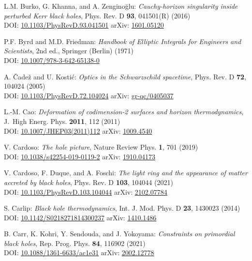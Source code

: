 \begin{thebibliography}{123}
L.M. Burko, G. Khanna, and A. Zenginoğlu: {\em
Cauchy-horizon singularity inside perturbed Kerr black holes},
Phys. Rev. D {\bf 93}, 041501(R) (2016) \\
DOI: \href{https://doi.org/10.1103/PhysRevD.93.041501}{10.1103/PhysRevD.93.041501}\hfill
arXiv: \href{https://arxiv.org/abs/1601.05120}{1601.05120}

P.F. Byrd and M.D. Friedman:
{\em Handbook of Elliptic Integrals for Engineers and Scientists},
2nd ed., Springer (Berlin) (1971)\\
DOI: \href{https://doi.org/10.1007/978-3-642-65138-0}{10.1007/978-3-642-65138-0}

A. \v{C}ade\v{z} and U. Kosti\'c:
{\em Optics in the Schwarzschild spacetime},
Phys. Rev. D {\bf 72}, 104024 (2005)\\
DOI: \href{https://doi.org/10.1103/PhysRevD.72.104024}{10.1103/PhysRevD.72.104024}\hfill
arXiv: \href{https://arxiv.org/abs/gr-qc/0405037}{gr-qc/0405037}

L.-M. Cao:
{\em Deformation of codimension-2 surfaces and horizon thermodynamics},
J.~High Energ. Phys. {\bf 2011}, 112 (2011)\\
DOI: \href{https://doi.org/10.1007/JHEP03(2011)112}{10.1007/JHEP03(2011)112}\hfill
arXiv: \href{https://arxiv.org/abs/1009.4540}{1009.4540}

V. Cardoso:
{\em The hole picture},
Nature Review Phys. {\bf 1}, 701 (2019)\\
DOI: \href{https://doi.org/10.1038/s42254-019-0119-2}{10.1038/s42254-019-0119-2}\hfill
arXiv: \href{https://arxiv.org/abs/1910.04173}{1910.04173}

V. Cardoso, F. Duque, and A. Foschi:
{\em The light ring and the appearance of matter accreted by black holes},
Phys. Rev. D {\bf 103}, 104044 (2021)\\
DOI: \href{https://doi.org/10.1103/PhysRevD.103.104044}{10.1103/PhysRevD.103.104044}\hfill
arXiv: \href{https://arxiv.org/abs/2102.07784}{2102.07784}

S. Carlip:
{\em Black hole thermodynamics},
Int. J. Mod. Phys. D {\bf 23}, 1430023 (2014)\\
DOI: \href{https://doi.org/10.1142/S0218271814300237}{10.1142/S0218271814300237}\hfill
arXiv: \href{https://arxiv.org/abs/1410.1486}{1410.1486}

B. Carr, K. Kohri, Y. Sendouda, and J. Yokoyama:
{\em Constraints on primordial black holes},
Rep. Prog. Phys. {\bf 84}, 116902 (2021)\\
DOI: \href{https://doi.org/10.1088/1361-6633/ac1e31}{10.1088/1361-6633/ac1e31}\hfill
arXiv: \href{https://arxiv.org/abs/2002.12778}{2002.12778}


\end{thebibliography}
